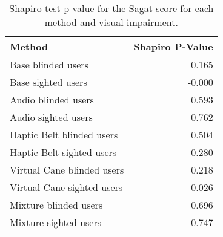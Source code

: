 
\begin{table}[!htb]
\centering
\caption{Shapiro test p-value for the Sagat score for each method and visual impairment.}
\label{tab:shapiro_sagat_score}
\begin{tabular}{lr}
\toprule
                    Method &  Shapiro P-Value \\
\midrule
        Base blinded users &            0.165 \\
        Base sighted users &           -0.000 \\
       Audio blinded users &            0.593 \\
       Audio sighted users &            0.762 \\
 Haptic Belt blinded users &            0.504 \\
 Haptic Belt sighted users &            0.280 \\
Virtual Cane blinded users &            0.218 \\
Virtual Cane sighted users &            0.026 \\
     Mixture blinded users &            0.696 \\
     Mixture sighted users &            0.747 \\
\bottomrule
\end{tabular}
\end{table}

